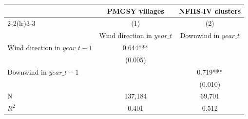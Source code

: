{
\def\sym#1{\ifmmode^{#1}\else\(^{#1}\)\fi}
\begin{tabular}{l*{2}{c}}
\hline\hline
                         &\multicolumn{1}{c}{PMGSY villages}&\multicolumn{1}{c}{NFHS-IV clusters}\\\cmidrule(lr){2-2}\cmidrule(lr){3-3}
                         &\multicolumn{1}{c}{(1)}&\multicolumn{1}{c}{(2)}\\
                         &\multicolumn{1}{c}{Wind direction in $ year\_{t} $}&\multicolumn{1}{c}{Downwind in $ year\_{t} $}\\
\hline
Wind direction in $ year\_{t-1} $&       0.644***&               \\
                         &     (0.005)   &               \\
[1em]
Downwind in $ year\_{t-1} $&               &       0.719***\\
                         &               &     (0.010)   \\
\hline
N                        &     137,184   &      69,701   \\
$ R^{2} $                &       0.401   &       0.512   \\
\hline\hline
\end{tabular}
}
